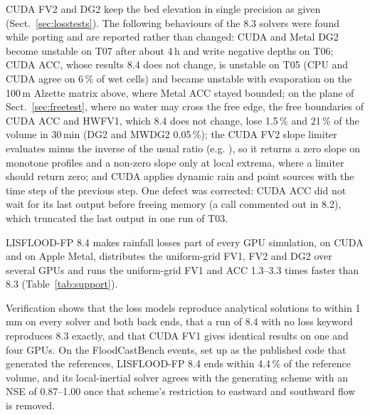 \documentclass[gmd, manuscript]{copernicus}
\begin{document}
CUDA FV2 and DG2 keep the bed elevation in single precision as given
(Sect.~\ref{sec:losstests}). The following behaviours of the 8.3 solvers were
found while porting and are reported rather than changed: CUDA and Metal DG2
become unstable on T07 after about 4\,h and write negative depths on T06;
CUDA ACC, whose results 8.4 does not change, is unstable on T05 (CPU and CUDA
agree on 6\,\% of wet cells) and became unstable with evaporation on the
100\,m Alzette matrix above, where Metal ACC stayed bounded; on the plane of
Sect.~\ref{sec:freetest}, where no water may cross the free edge, the free
boundaries of CUDA ACC and HWFV1, which 8.4 does not change, lose 1.5\,\% and
21\,\% of the volume in 30\,min (DG2 and MWDG2 0.05\,\%); the CUDA FV2
slope limiter evaluates minus the inverse of the usual ratio (e.g.
\citealp{Ayog2021}), so it returns a zero slope on
monotone profiles and a non-zero slope only at local extrema, where a limiter
should return zero; and CUDA applies dynamic rain
and point sources with the time step of the previous step. One defect was
corrected: CUDA ACC did not wait for its last output before freeing memory (a
call commented out in 8.2), which truncated the last output in one run of
T03.

\conclusions

LISFLOOD-FP 8.4 makes rainfall losses part of every GPU simulation, on CUDA
and on Apple Metal, distributes the uniform-grid FV1, FV2 and DG2 over
several GPUs and runs the uniform-grid FV1 and ACC 1.3--3.3 times faster
than 8.3 (Table~\ref{tab:support}).

Verification shows that the loss models reproduce analytical solutions to
within 1\,mm on every solver and both back ends, that a run of 8.4 with no
loss keyword reproduces 8.3 exactly, and that CUDA FV1 gives identical results on one and four
GPUs. On the
FloodCastBench events, set up as the published code that generated the
references, LISFLOOD-FP 8.4 ends within 4.4\,\% of the reference volume, and
its local-inertial solver agrees with the generating scheme with an NSE of
0.87--1.00 once that scheme's restriction to eastward and southward flow is
removed.
\end{document}
